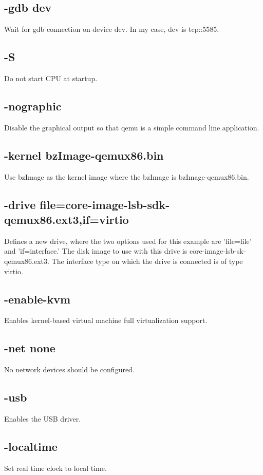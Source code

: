 \documentclass[letterpaper,
10pt, titlepage, draftclsnofoot, onecolumn]{IEEEtran}
\begin{document}
\subsection*{-gdb dev}
Wait for gdb connection on device dev. In my case, dev is tcp::5585.

\subsection*{-S}
Do not start CPU at startup.

\subsection*{-nographic}
Disable the graphical output so that qemu is a simple command line application.

\subsection*{-kernel bzImage-qemux86.bin}
Use bzImage as the kernel image where the bzImage is bzImage-qemux86.bin.

\subsection*{-drive file=core-image-lsb-sdk-qemux86.ext3,if=virtio}
Defines a new drive, where the two options used for this example are 'file=file' and 'if=interface.' The disk image to use with this drive is core-image-lsb-sk-qemux86.ext3. The interface type on which the drive is connected is of type virtio.

\subsection*{-enable-kvm}
Enables kernel-based virtual machine full virtualization support.

\subsection*{-net none}
No network devices should be configured.

\subsection*{-usb}
Enables the USB driver.

\subsection*{-localtime}
Set real time clock to local time.
\end{document}

